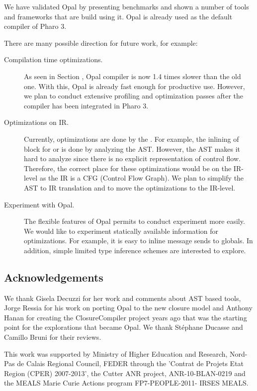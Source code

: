 \documentclass[preprint,10pt]{sigplanconf}
\begin{document}
We have validated Opal by presenting benchmarks and shown a number of tools and frameworks that are build using it. Opal is already used as the default compiler  of Pharo 3.

There are many possible direction for future work, for example:

\begin{description}
\item[Compilation time optimizations.] As seen in Section , Opal compiler is now 1.4 times slower than the old one. With this, Opal is already fast enough for productive use. However, we plan to conduct extensive profiling and optimization passes after the compiler has been integrated in Pharo 3.

\item[Optimizations on IR.] Currently, optimizations are done by the . For example, the inlining of block for  or  is done by analyzing the AST. However, the AST makes it hard to analyze since there is no explicit representation of control flow. Therefore, the correct place for these optimizations would be on the IR-level as the IR is a CFG (Control Flow Graph). We plan to simplify the AST to IR translation and to move the optimizations to the IR-level.

\item[Experiment with Opal.] The flexible features of Opal permits to conduct experiment more easily. We would like to experiment statically available information for optimizations. For example, it is easy to inline message sends to globals. In addition, simple limited type inference schemes are interested to explore.
\end{description}

\subsection*{Acknowledgements} We thank Gisela Decuzzi for her work and comments about AST based tools, Jorge Ressia for his work on porting Opal to the new closure model and Anthony Hanan for creating the ClosureCompiler project years ago that was the starting point for the explorations that became Opal. We thank St\'ephane Ducasse and Camillo Bruni for their reviews.

This work was supported by Ministry of Higher Education and Research, Nord-Pas de Calais Regional Council, FEDER through the 'Contrat de
Projets Etat Region (CPER) 2007-2013',  the Cutter ANR project, ANR-10-BLAN-0219 and the MEALS Marie Curie Actions program FP7-PEOPLE-2011-
IRSES MEALS. 

% 
% 
\balance


\end{document}
